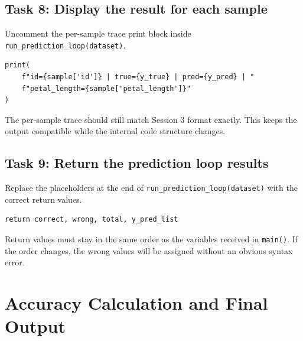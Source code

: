 \subsection{Task 8: Display the result for each sample}

\begin{tcolorbox}[title=Task 8: Display the result for each sample]
Uncomment the per-sample trace print block inside \texttt{run\_prediction\_loop(dataset)}.
\end{tcolorbox}

\begin{verbatim}
print(
    f"id={sample['id']} | true={y_true} | pred={y_pred} | "
    f"petal_length={sample['petal_length']}"
)
\end{verbatim}

\begin{tcolorbox}[title=Checkpoint]
The per-sample trace should still match Session 3 format exactly. This keeps the output compatible while the internal code structure changes.
\end{tcolorbox}

\subsection{Task 9: Return the prediction loop results}

\begin{tcolorbox}[title=Task 9: Return the prediction loop results]
Replace the placeholders at the end of \texttt{run\_prediction\_loop(dataset)} with the correct return values.
\end{tcolorbox}

\begin{verbatim}
return correct, wrong, total, y_pred_list
\end{verbatim}

\begin{tcolorbox}[title=Good Practice]
Return values must stay in the same order as the variables received in \texttt{main()}. If the order changes, the wrong values will be assigned without an obvious syntax error.
\end{tcolorbox}

\section{Accuracy Calculation and Final Output}

